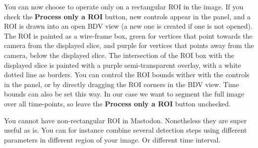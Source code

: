 You can now choose to operate only on a rectangular ROI in the image. 
If you check the \textbf{Process only a ROI} button, new controls appear in the panel, and a ROI is drawn into an open BDV view (a new one is created if one is not opened).
The ROI is painted as a wire-frame box, green for vertices that point towards the camera from the displayed slice, and purple for vertices that points away from the camera, below the displayed slice.
The intersection of the ROI box with the displayed slice is painted with a purple semi-transparent overlay, with a white dotted line as borders.
You can control the ROI bounds wither with the controls in the panel, or by directly dragging the ROI corners in the BDV view.
Time bounds can also be set this way. In our case we want to segment the full image over all time-points, so leave the \textbf{Process only a ROI} button unchecked.

You cannot have non-rectangular ROI in Mastodon. Nonetheless they are super useful as is. 
You can for instance combine several detection steps using different parameters in different region of your image. Or different time interval.

